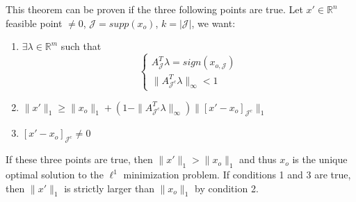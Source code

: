 \documentclass[12pt, openany]{report}
\newcommand{\R}{\mathbb{R}}
\theoremstyle{definition}
\begin{document}
This theorem can be proven if the three following points are true. Let $x' \in \R^n$ feasible point $\neq 0$, $\mathcal{J} = supp(x_o)$, $k = |\mathcal{J}|$, we want:
\begin{enumerate}
	\item $\exists \lambda \in \R^m$ such that 
	\begin{equation}\label{eq:sign-cond}
		\begin{cases}
			A_\mathcal{J}^T \lambda = sign(x_{o,\mathcal{J}})\\
			\|A_{\mathcal{J}^c}^T \lambda\|_\infty < 1
		\end{cases}
	\end{equation}
	\item $\|x'\|_1 \geq \|x_o\|_1 + (1-\|A_{\mathcal{J}^c}^T \lambda\|_\infty) \|[x'-x_o]_{\mathcal{J}^c}\|_1$
	\item $[x'-x_o]_{\mathcal{J}^c} \neq 0$
\end{enumerate}
If these three points are true, then $\|x'\|_1 > \|x_o\|_1$ and thus $x_o$ is the unique optimal solution to the $\ell^1$ minimization problem. If conditions 1 and 3 are true, then $\|x'\|_1$ is strictly larger than $\|x_o\|_1$ by condition 2. \\
\end{document}
